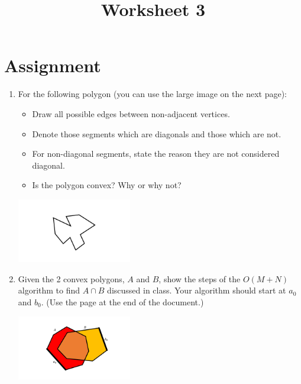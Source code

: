 \documentclass[a4paper,12pt]{article}
\title{Worksheet 3}
\begin{document}
\maketitle

\worksheetGroundRules


\vspace{5pt}
\section{Assignment}

\begin{enumerate}


\item For the following polygon (you can use the large image on the next page):

\begin{minipage}[m]{0.6\textwidth}
\begin{itemize}
\item Draw all possible edges between non-adjacent vertices. 
\item Denote those segments which are diagonals and those which are not. 
\item For non-diagonal segments, state the reason they are not considered diagonal. 
\item Is the polygon convex? Why or why not?
\end{itemize}
\end{minipage}
%
\hfill
%
\begin{minipage}[m]{5.5cm}
\begin{center}
\includegraphics[width=5cm]{../images/worksheet2a.pdf}
\end{center}
\end{minipage}




\item Given the 2 convex polygons, $A$ and $B$, show the steps of the $O(M+N)$ algorithm to find $A \cap B$ discussed in class. Your algorithm should start at $a_0$ and $b_0$. (Use the page at the end of the document.)


\begin{center}
\includegraphics[width=5cm]{../images/worksheet2b.pdf}
\end{center}


\end{enumerate}
\end{document}
